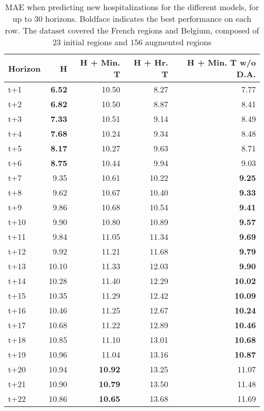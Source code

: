 \begin{table}[H]
\centering
\caption{MAE when predicting new hospitalizations for the different models, for up to 30 horizons. Boldface indicates the best performance on each row. The dataset covered the French regions and Belgium, composed of 23 initial regions and 156 augmented regions }
\label{tab:MAE_comparison}
\begin{tabular}{lrrrr}
\toprule
Horizon &     H &  H + Min. T &  H + Hr. T &  H + Min. T w/o D.A. \\
\midrule
t+1  & \textbf{6.52}  & 10.50  & 8.27  & 7.77  \\
t+2  & \textbf{6.82}  & 10.50  & 8.87  & 8.41  \\
t+3  & \textbf{7.33}  & 10.51  & 9.14  & 8.49  \\
t+4  & \textbf{7.68}  & 10.24  & 9.34  & 8.48  \\
t+5  & \textbf{8.17}  & 10.27  & 9.63  & 8.71  \\
t+6  & \textbf{8.75}  & 10.44  & 9.94  & 9.03  \\
t+7  & 9.35  & 10.61  & 10.22  & \textbf{9.25}  \\
t+8  & 9.62  & 10.67  & 10.40  & \textbf{9.33}  \\
t+9  & 9.86  & 10.68  & 10.54  & \textbf{9.41}  \\
t+10  & 9.90  & 10.80  & 10.89  & \textbf{9.57}  \\
t+11  & 9.84  & 11.05  & 11.34  & \textbf{9.69}  \\
t+12  & 9.92  & 11.21  & 11.68  & \textbf{9.79}  \\
t+13  & 10.10  & 11.33  & 12.03  & \textbf{9.90}  \\
t+14  & 10.28  & 11.40  & 12.29  & \textbf{10.02}  \\
t+15  & 10.35  & 11.29  & 12.42  & \textbf{10.09}  \\
t+16  & 10.46  & 11.25  & 12.67  & \textbf{10.24}  \\
t+17  & 10.68  & 11.22  & 12.89  & \textbf{10.46}  \\
t+18  & 10.85  & 11.10  & 13.01  & \textbf{10.68}  \\
t+19  & 10.96  & 11.04  & 13.16  & \textbf{10.87}  \\
t+20  & 10.94  & \textbf{10.92}  & 13.25  & 11.07  \\
t+21  & 10.90  & \textbf{10.79}  & 13.50  & 11.48  \\
t+22  & 10.86  & \textbf{10.65}  & 13.68  & 11.69  \\

\end{tabular}
\end{table}
